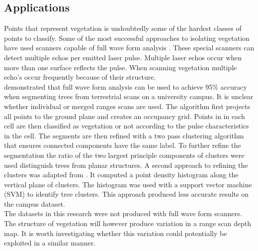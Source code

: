 


\subsection{Applications}

Points that represent vegetation is undoubtedly some of the hardest classes of points to classify. Some of the most successful approaches to isolating vegetation have used scanners capable of full wave form analysis \cite{Reitberger2009, Elseberg2011}. These special scanners can detect multiple echos per emitted laser pulse. Multiple laser echos occur when more than one surface reflects the pulse. When scanning vegetation multiple echo's occur frequently because of their structure.\\

\citet{Elseberg2011} demonstrated that full wave form analysis can be used to achieve 95\% accuracy when segmenting trees from terrestrial scans on a university campus. It is unclear whether individual or merged ranges scans are used. The algorithm first projects all points to the ground plane and creates an occupancy grid. Points in in each cell are then classified as vegetation or not according to the pulse characteristics in the cell. The segments are then refined with a two pass clustering algorithm that ensures connected components have the same label. To further refine the segmentation the ratio of the two largest principle components of clusters were used distinguish trees from planar structures. A second approach to refining the clusters was adapted from \citet{Reitberger2009}. It computed a point density histogram along the vertical plane of clusters. The histogram was used with a support vector machine (SVM) to identify tree clusters. This approach produced less accurate results on the campus dataset.\\

The datasets in this research were not produced with full wave form scanners. The structure of vegetation will however produce variation in a range scan depth map. It is worth investigating whether this variation could potentially be exploited in a similar manner.\\


